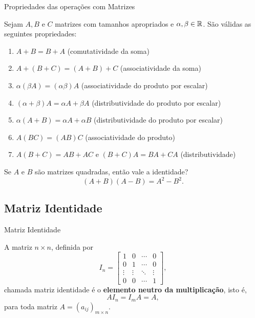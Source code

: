 \begin{frame}[label=matrizes]{Propriedades das operações com Matrizes}

Sejam $A, B$ e $C$ matrizes com tamanhos apropriados e $\alpha,\beta\in \mathbb{R}$. São válidas as seguintes propriedades:

\begin{enumerate}
\item $A+B=B+A$ (comutatividade da soma)
\item $A+(B+C)=(A+B)+C$ (associatividade da soma)
\item $\alpha(\beta A)=(\alpha \beta)A$ (associatividade do produto por escalar)
\item $(\alpha+\beta)A=\alpha A+\beta A$ (distributividade do produto por escalar)
\item $\alpha(A+B)=\alpha A+\alpha B$ (distributividade do produto por escalar)
\item $A(BC)=(AB)C$ (associatividade do produto)
\item $A(B+C)=AB+AC$ e $(B+C)A=BA+CA$ (distributividade)
\end{enumerate}


\end{frame}


\begin{frame}
\begin{exe}
Se $A$ e $B$ são matrizes quadradas, então vale a identidade? \[(A+B)(A-B)=A^2-B^2.\]
\end{exe}
\end{frame}


\subsection*{Matriz Identidade}
\begin{frame}[label=matrizes]{Matriz Identidade}

A matriz $n\times n$, definida por
\[I_n=\begin{bmatrix}
1 & 0 & \cdots & 0\\
0 & 1 & \cdots & 0\\
\vdots & \vdots & \ddots & \vdots\\
0 & 0 & \cdots & 1
\end{bmatrix},\]
chamada {\color{blue} matriz identidade} é o \textbf{elemento neutro da multiplicação}, isto é, 
\[AI_n=I_mA=A,\]
para toda matriz $A=(a_{ij})_{m\times n}$.



\end{frame}





